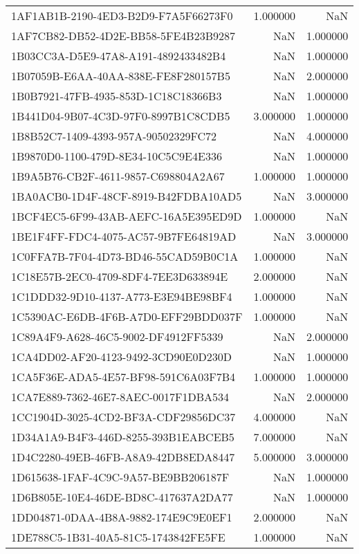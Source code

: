 \begin{tabular}{lrr}
1AF1AB1B-2190-4ED3-B2D9-F7A5F66273F0 & 1.000000 & NaN \\
1AF7CB82-DB52-4D2E-BB58-5FE4B23B9287 & NaN & 1.000000 \\
1B03CC3A-D5E9-47A8-A191-4892433482B4 & NaN & 1.000000 \\
1B07059B-E6AA-40AA-838E-FE8F280157B5 & NaN & 2.000000 \\
1B0B7921-47FB-4935-853D-1C18C18366B3 & NaN & 1.000000 \\
1B441D04-9B07-4C3D-97F0-8997B1C8CDB5 & 3.000000 & 1.000000 \\
1B8B52C7-1409-4393-957A-90502329FC72 & NaN & 4.000000 \\
1B9870D0-1100-479D-8E34-10C5C9E4E336 & NaN & 1.000000 \\
1B9A5B76-CB2F-4611-9857-C698804A2A67 & 1.000000 & 1.000000 \\
1BA0ACB0-1D4F-48CF-8919-B42FDBA10AD5 & NaN & 3.000000 \\
1BCF4EC5-6F99-43AB-AEFC-16A5E395ED9D & 1.000000 & NaN \\
1BE1F4FF-FDC4-4075-AC57-9B7FE64819AD & NaN & 3.000000 \\
1C0FFA7B-7F04-4D73-BD46-55CAD59B0C1A & 1.000000 & NaN \\
1C18E57B-2EC0-4709-8DF4-7EE3D633894E & 2.000000 & NaN \\
1C1DDD32-9D10-4137-A773-E3E94BE98BF4 & 1.000000 & NaN \\
1C5390AC-E6DB-4F6B-A7D0-EFF29BDD037F & 1.000000 & NaN \\
1C89A4F9-A628-46C5-9002-DF4912FF5339 & NaN & 2.000000 \\
1CA4DD02-AF20-4123-9492-3CD90E0D230D & NaN & 1.000000 \\
1CA5F36E-ADA5-4E57-BF98-591C6A03F7B4 & 1.000000 & 1.000000 \\
1CA7E889-7362-46E7-8AEC-0017F1DBA534 & NaN & 2.000000 \\
1CC1904D-3025-4CD2-BF3A-CDF29856DC37 & 4.000000 & NaN \\
1D34A1A9-B4F3-446D-8255-393B1EABCEB5 & 7.000000 & NaN \\
1D4C2280-49EB-46FB-A8A9-42DB8EDA8447 & 5.000000 & 3.000000 \\
1D615638-1FAF-4C9C-9A57-BE9BB206187F & NaN & 1.000000 \\
1D6B805E-10E4-46DE-BD8C-417637A2DA77 & NaN & 1.000000 \\
1DD04871-0DAA-4B8A-9882-174E9C9E0EF1 & 2.000000 & NaN \\
1DE788C5-1B31-40A5-81C5-1743842FE5FE & 1.000000 & NaN \\

\end{tabular}
